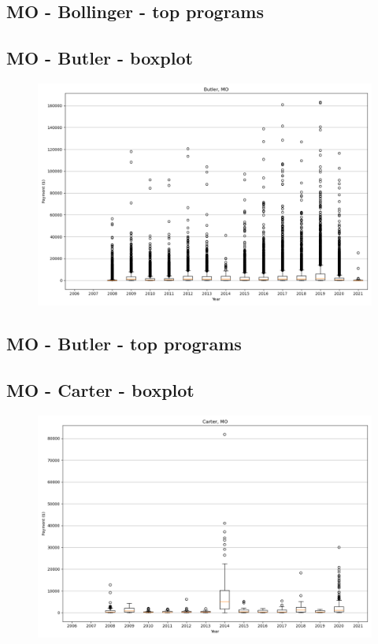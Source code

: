 \subsection*{MO - Bollinger - top programs}

\newpage
\subsection*{MO - Butler - boxplot}
\begin{figure}[h]
\centering
\includegraphics[width=7in]{../output/boxplots/counties/Butler-MO_boxplot.png}
\end{figure}


\subsection*{MO - Butler - top programs}

\newpage
\subsection*{MO - Carter - boxplot}
\begin{figure}[h]
\centering
\includegraphics[width=7in]{../output/boxplots/counties/Carter-MO_boxplot.png}
\end{figure}


